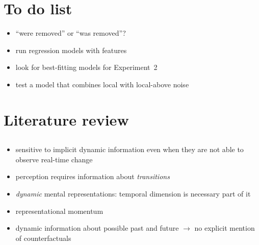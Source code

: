 \documentclass[10pt, letterpaper]{article}
\begin{document}
% 


\clearpage 

\section{To do list}
\label{sec:to_do_list}

\begin{itemize}
	\item ``were removed'' or ``was removed''?
	\item run regression models with features
	\item look for best-fitting models for Experiment~2
	\item test a model that combines local with local-above noise 
\end{itemize}

\section{Literature review}
\label{sec:literature_review}

\subsection{\cite{freyd1987dynamic}}

\begin{itemize}
	\item sensitive to implicit dynamic information even when they are not able to observe real-time change 
	\item perception requires information about \emph{transitions} 
	\item \emph{dynamic} mental representations: temporal dimension is necessary part of it 
	\item representational momentum 
	\item dynamic information about possible past and future $\rightarrow$ no explicit mention of counterfactuals 
\end{itemize}
\end{document}
